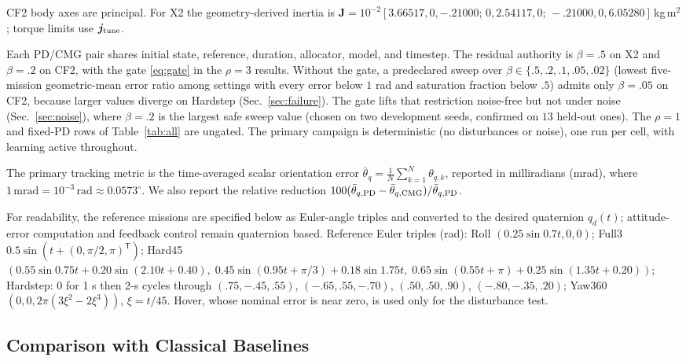 \documentclass[letterpaper, 10 pt, conference]{ieeeconf}
\newcommand{\T}{^{\mathsf T}}
\begin{document}
CF2 body axes are principal. For X2 the geometry-derived inertia is
$\bm J=10^{-2}[3.66517,0,-.21000;\allowbreak\,0,2.54117,0;\allowbreak\,-.21000,0,6.05280]$\,kg\,m$^2$;
torque limits use $\bm j_{\rm tune}$.

Each PD/CMG pair shares initial state, reference, duration, allocator, model, and timestep. The residual authority is $\beta=.5$ on X2 and $\beta=.2$ on CF2, with the gate \eqref{eq:gate} in the $\rho=3$ results. Without the gate, a predeclared sweep over $\beta\in\{.5,.2,.1,.05,.02\}$ (lowest five-mission geometric-mean error ratio among settings with every error below $1$ rad and saturation fraction below $.5$) admits only $\beta=.05$ on CF2, because larger values diverge on Hardstep (Sec.~\ref{sec:failure}). The gate lifts that restriction noise-free but not under noise (Sec.~\ref{sec:noise}), where $\beta=.2$ is the largest safe sweep value (chosen on two development seeds, confirmed on $13$ held-out ones). The $\rho=1$ and fixed-PD rows of Table~\ref{tab:all} are ungated. The primary campaign is deterministic (no disturbances or noise), one run per cell, with learning active throughout.

The primary tracking metric is the time-averaged scalar orientation error $\bar{\theta}_q=\frac{1}{N}\sum_{k=1}^{N}\theta_{q,k}$, reported in milliradians (mrad), where $1\,\mathrm{mrad}=10^{-3}\,\mathrm{rad}\approx0.0573^\circ$. We also report the relative reduction $100(\bar\theta_{q,\rm PD}-\bar\theta_{q,\rm CMG})/\bar\theta_{q,\rm PD}$.

For readability, the reference missions are specified below as Euler-angle
triples and converted to the desired quaternion $q_d(t)$; attitude-error
computation and feedback control remain quaternion based.
Reference Euler triples (rad): Roll $(0.25\sin0.7t,0,0)$; Full3 $0.5\sin(t+(0,\pi/2,\pi)\T)$; Hard45
$(0.55\sin0.75t+0.20\sin(2.10t+0.40),\allowbreak\;0.45\sin(0.95t+\pi/3)+0.18\sin1.75t,\allowbreak\;0.65\sin(0.55t+\pi)+0.25\sin(1.35t+0.20))$;
Hardstep: $0$ for 1 s then 2-s cycles through $(.75,-.45,.55)$, $(-.65,.55,-.70)$, $(.50,.50,.90)$, $(-.80,-.35,.20)$; Yaw360 $(0,0,2\pi(3\xi^2-2\xi^3))$, $\xi=t/45$. Hover, whose nominal error is near zero, is used only for the disturbance test.



\subsection{Comparison with Classical Baselines}
\label{sec:baselines}
\end{document}
